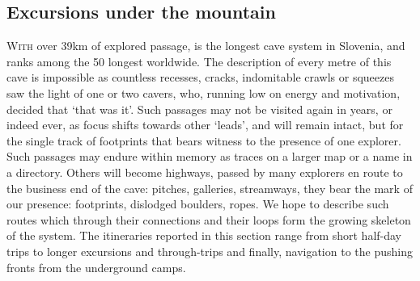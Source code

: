 \begin{tcolorbox}
	\vspace{60pt}
	\part{Excursions under the mountain}
	\lettrine{W}{ith} over 39km of explored passage,  is the longest cave system in Slovenia, and ranks among the 50 longest worldwide. The description of every metre of this cave is impossible as countless recesses, cracks, indomitable crawls or squeezes saw the light of one or two cavers, who, running low on energy and motivation, decided that `that was it'. Such passages may not be visited again in years, or indeed ever, as focus shifts towards other `leads', and will remain intact, but for the single track of footprints that bears witness to the presence of one explorer. Such passages may endure within memory as traces on a larger map or a name in a directory. Others will become highways, passed by many explorers en route to the business end of the cave: pitches, galleries, streamways, they bear the mark of our presence: footprints, dislodged boulders, ropes. We hope to describe such routes which through their connections and their loops form the growing skeleton of the system. The itineraries reported in this section range from short half-day trips  to longer excursions and through-trips and finally, navigation to the pushing fronts from the underground camps.
\end{tcolorbox}

	
\BgThispage

